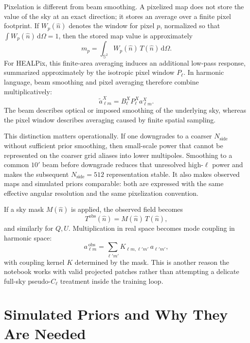 \documentclass[11pt]{article}
\newcommand{\dd}{\mathrm{d}}
\begin{document}
Pixelation is different from beam smoothing. A pixelized map does not store the value of the sky at an exact direction; it stores an average over a finite pixel footprint. If \(W_p(\hat n)\) denotes the window for pixel \(p\), normalized so that \(\int W_p(\hat n)\,\dd\Omega = 1\), then the stored map value is approximately
\begin{equation}
  m_p
  =
  \int_{\mathbb S^2} W_p(\hat n)\,T(\hat n)\,\dd\Omega.
\end{equation}
For HEALPix, this finite-area averaging induces an additional low-pass response, summarized approximately by the isotropic pixel window \(P_\ell\). In harmonic language, beam smoothing and pixel averaging therefore combine multiplicatively:
\begin{equation}
  \tilde a_{\ell m}^X
  =
  B_\ell^X P_\ell^X a_{\ell m}^X.
\end{equation}
The beam describes optical or imposed smoothing of the underlying sky, whereas the pixel window describes averaging caused by finite spatial sampling.

This distinction matters operationally. If one downgrades to a coarser \(N_{\mathrm{side}}\) without sufficient prior smoothing, then small-scale power that cannot be represented on the coarser grid aliases into lower multipoles. Smoothing to a common \(10'\) beam before downgrade reduces that unresolved high-\(\ell\) power and makes the subsequent \(N_{\mathrm{side}}=512\) representation stable. It also makes observed maps and simulated priors comparable: both are expressed with the same effective angular resolution and the same pixelization convention.

If a sky mask \(M(\hat n)\) is applied, the observed field becomes
\begin{equation}
  T^{\mathrm{obs}}(\hat n) = M(\hat n)\,T(\hat n),
\end{equation}
and similarly for \(Q,U\). Multiplication in real space becomes mode coupling in harmonic space:
\begin{equation}
  a_{\ell m}^{\,\mathrm{obs}} = \sum_{\ell' m'} K_{\ell m,\ell' m'}\,a_{\ell' m'},
\end{equation}
with coupling kernel \(K\) determined by the mask. This is another reason the notebook works with valid projected patches rather than attempting a delicate full-sky pseudo-\(C_\ell\) treatment inside the training loop.

\section{Simulated Priors and Why They Are Needed}
\end{document}
